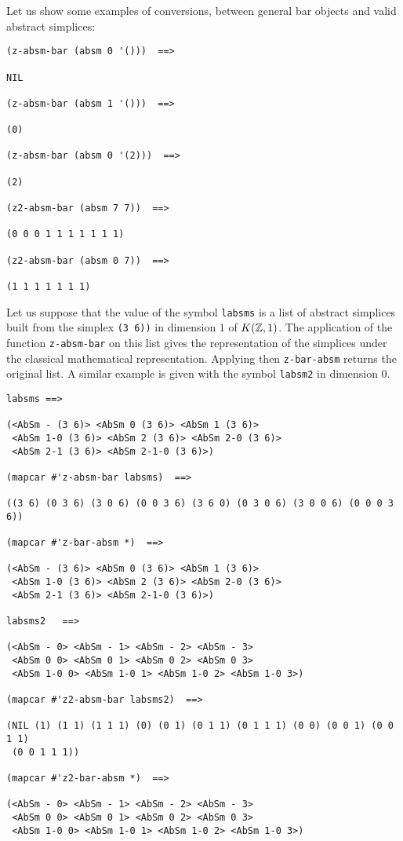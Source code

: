 Let us show some examples of conversions, between general bar objects and valid abstract simplices:
{\footnotesize\begin{verbatim}
(z-absm-bar (absm 0 '()))  ==>

NIL

(z-absm-bar (absm 1 '()))  ==>

(0)

(z-absm-bar (absm 0 '(2)))  ==>

(2)

(z2-absm-bar (absm 7 7))  ==>

(0 0 0 1 1 1 1 1 1 1)

(z2-absm-bar (absm 0 7))  ==>

(1 1 1 1 1 1 1)
\end{verbatim}}
Let us suppose that the value of the symbol {\tt labsms} is a list of
abstract simplices built from the simplex {\tt (3 6))} in dimension $1$ of $K({{\Bbb Z}}, 1)$.
The application of the function {\tt z-absm-bar} on this list gives the representation
of the simplices under the classical mathematical representation. Applying then {\tt z-bar-absm}
returns the original list. A similar example is given with the symbol {\tt labsm2} in dimension $0$.
{\footnotesize\begin{verbatim}
labsms ==>

(<AbSm - (3 6)> <AbSm 0 (3 6)> <AbSm 1 (3 6)> 
 <AbSm 1-0 (3 6)> <AbSm 2 (3 6)> <AbSm 2-0 (3 6)> 
 <AbSm 2-1 (3 6)> <AbSm 2-1-0 (3 6)>)

(mapcar #'z-absm-bar labsms)  ==>

((3 6) (0 3 6) (3 0 6) (0 0 3 6) (3 6 0) (0 3 0 6) (3 0 0 6) (0 0 0 3 6))

(mapcar #'z-bar-absm *)  ==>

(<AbSm - (3 6)> <AbSm 0 (3 6)> <AbSm 1 (3 6)> 
 <AbSm 1-0 (3 6)> <AbSm 2 (3 6)> <AbSm 2-0 (3 6)> 
 <AbSm 2-1 (3 6)> <AbSm 2-1-0 (3 6)>)

labsms2   ==>

(<AbSm - 0> <AbSm - 1> <AbSm - 2> <AbSm - 3> 
 <AbSm 0 0> <AbSm 0 1> <AbSm 0 2> <AbSm 0 3> 
 <AbSm 1-0 0> <AbSm 1-0 1> <AbSm 1-0 2> <AbSm 1-0 3>)

(mapcar #'z2-absm-bar labsms2)  ==>

(NIL (1) (1 1) (1 1 1) (0) (0 1) (0 1 1) (0 1 1 1) (0 0) (0 0 1) (0 0 1 1) 
 (0 0 1 1 1))

(mapcar #'z2-bar-absm *)  ==>

(<AbSm - 0> <AbSm - 1> <AbSm - 2> <AbSm - 3> 
 <AbSm 0 0> <AbSm 0 1> <AbSm 0 2> <AbSm 0 3> 
 <AbSm 1-0 0> <AbSm 1-0 1> <AbSm 1-0 2> <AbSm 1-0 3>)
\end{verbatim}}
\newpage


